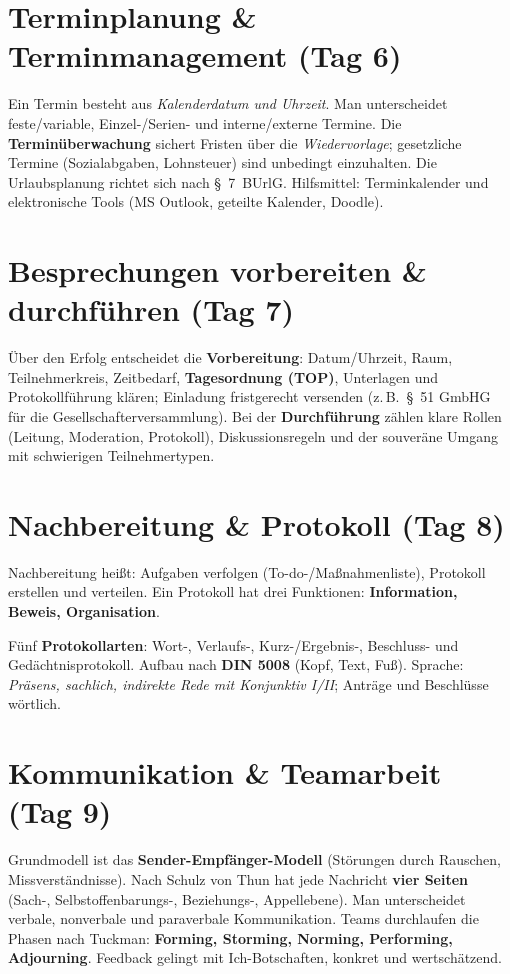 \documentclass[11pt, a4paper]{article}
\begin{document}
\section{Terminplanung \& Terminmanagement (Tag 6)}

Ein Termin besteht aus \emph{Kalenderdatum und Uhrzeit}. Man unterscheidet feste/variable,
Einzel-/Serien- und interne/externe Termine. Die \textbf{Terminüberwachung} sichert
Fristen über die \emph{Wiedervorlage}; gesetzliche Termine (Sozialabgaben, Lohnsteuer)
sind unbedingt einzuhalten. Die Urlaubsplanung richtet sich nach \S~7~BUrlG. Hilfsmittel:
Terminkalender und elektronische Tools (MS Outlook, geteilte Kalender, Doodle).

\section{Besprechungen vorbereiten \& durchführen (Tag 7)}

Über den Erfolg entscheidet die \textbf{Vorbereitung}: Datum/Uhrzeit, Raum, Teilnehmerkreis,
Zeitbedarf, \textbf{Tagesordnung (TOP)}, Unterlagen und Protokollführung klären; Einladung
fristgerecht versenden (z.\,B.\ \S~51 GmbHG für die Gesellschafterversammlung). Bei der
\textbf{Durchführung} zählen klare Rollen (Leitung, Moderation, Protokoll), Diskussions\-regeln
und der souveräne Umgang mit schwierigen Teilnehmertypen.

\section{Nachbereitung \& Protokoll (Tag 8)}

Nachbereitung heißt: Aufgaben verfolgen (To-do-/Maßnahmenliste), Protokoll erstellen und
verteilen. Ein Protokoll hat drei Funktionen: \textbf{Information, Beweis, Organisation}.

\begin{merksatz}
Fünf \textbf{Protokollarten}: Wort-, Verlaufs-, Kurz-/Ergebnis-, Beschluss- und
Gedächtnisprotokoll. Aufbau nach \textbf{DIN 5008} (Kopf, Text, Fuß). Sprache:
\emph{Präsens, sachlich, indirekte Rede mit Konjunktiv I/II}; Anträge und Beschlüsse
wörtlich.
\end{merksatz}

\section{Kommunikation \& Teamarbeit (Tag 9)}

Grundmodell ist das \textbf{Sender-Empfänger-Modell} (Störungen durch Rauschen,
Missverständnisse). Nach Schulz von Thun hat jede Nachricht \textbf{vier Seiten}
(Sach-, Selbstoffenbarungs-, Beziehungs-, Appellebene). Man unterscheidet verbale,
nonverbale und paraverbale Kommunikation. Teams durchlaufen die Phasen nach Tuckman:
\textbf{Forming, Storming, Norming, Performing, Adjourning}. Feedback gelingt mit
Ich-Botschaften, konkret und wertschätzend.
\end{document}
